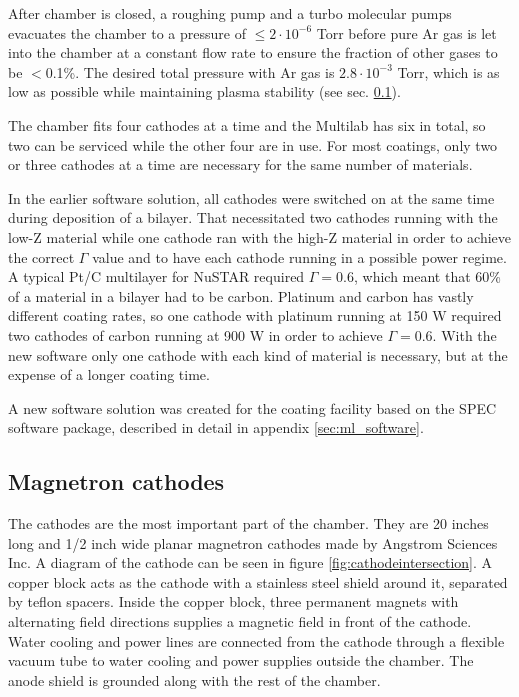 After chamber is closed, a roughing pump and a turbo molecular pumps evacuates the chamber to a pressure of $\leq2\cdot10^{-6}$ Torr before pure Ar gas is let into the chamber at a constant flow rate to ensure the fraction of other gases to be $<$0.1\%. The desired total pressure with Ar gas is $2.8\cdot10^{-3}$ Torr, which is as low as possible while maintaining plasma stability (see sec. \ref{sec:magnetrons}).

The chamber fits four cathodes at a time and the Multilab has six in total, so two can be serviced while the other four are in use. For most coatings, only two or three cathodes at a time are necessary for the same number of materials.

In the earlier software solution, all cathodes were switched on at the same time during deposition of a bilayer. That necessitated two cathodes running with the low-Z material while one cathode ran with the high-Z material in order to achieve the correct $\Gamma$ value and to have each cathode running in a possible power regime. A typical Pt/C  multilayer for NuSTAR required $\Gamma = 0.6$, which meant that 60\% of a material in a bilayer had to be carbon. Platinum and carbon has vastly different coating rates, so one cathode with platinum running at 150 W required two cathodes of carbon running at 900 W in order to achieve $\Gamma = 0.6$. With the new software only one cathode with each kind of material is necessary, but at the expense of a longer coating time.

A new software solution was created for the coating facility based on the SPEC software package, described in detail in appendix \ref{sec:ml_software}.

\subsection{Magnetron cathodes}\label{sec:magnetrons}
The cathodes are the most important part of the chamber. They are 20 inches long and 1/2 inch wide planar magnetron cathodes made by Angstrom Sciences Inc. A diagram of the cathode can be seen in figure \ref{fig:cathodeintersection}. A copper block acts as the cathode with a stainless steel shield around it, separated by teflon spacers. Inside the copper block, three permanent magnets with alternating field directions supplies a magnetic field in front of the cathode. Water cooling and power lines are connected from the cathode through a flexible vacuum tube to water cooling and power supplies outside the chamber. The anode shield is grounded along with the rest of the chamber.

